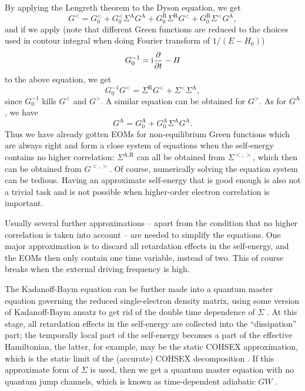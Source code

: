 \documentclass[hyperref, a4paper]{article}
\newcommand*{\ii}{\mathrm{i}}
\begin{document}
By applying the Lengreth theorem to the Dyson equation, we get 
\cite{rammer1986quantum,vspivcka2005long}
\begin{equation}
    G^< = G^<_0 + G^<_0 \Sigma^{\text{A}} G^{\text{A}}
    + G_0^{\text{R}} \Sigma^{\text{R}} G^< 
    + G_0^{\text{R}} \Sigma^{<} G^\text{A} ,
\end{equation}
and if we apply (note that different Green functions are reduced to 
the choices used in contour integral when doing Fourier transform of $1 / (E - H_0)$)
\begin{equation}
    G_0^{-1} = \ii \pdv{t} - H
\end{equation}
to the above equation, we get 
\begin{equation}
    G_0^{-1} G^< = \Sigma^{\text{R}} G^< + \Sigma^< \Sigma^{\text{A}},
\end{equation}
since $G_0^{-1}$ kills $G^<$ and $G^>$.
A similar equation can be obtained for $G^>$.
As for $G^{\text{A}}$, we have 
\begin{equation}
    G^{\text{A}} = G^{\text{A}}_0 + G^{\text{A}}_0 \Sigma^{\text{A}} G^{\text{A}}.
\end{equation}
Thus we have already gotten EOMs for non-equilibrium Green functions 
which are always right
and form a close system of equations
when the self-energy contains no higher correlation: 
$\Sigma^{\text{A}, \text{R}}$ can all be obtained from $\Sigma^{<,>}$,
which then can be obtained from $G^{<, >}$.
Of course, numerically solving the equation system can be tedious. 
Having an approximate self-energy that is good enough
is also not a trivial task and is not possible 
when higher-order electron correlation is important.

Usually several further approximations -- apart from 
the condition that no higher correlation is taken into account --
are needed to simplify the equations.
One major approximation is to discard all retardation effects in the self-energy,
and the EOMs then only contain one time variable,
instead of two.
This of course breaks when the external driving frequency is high.

The Kadanoff-Baym equation can be further made into a quantum master equation 
governing the reduced single-electron density matrix, 
using some version of Kadanoff-Baym ansatz 
to get rid of the double time dependence of $\Sigma$
\cite{lipavsky1986generalized,PhysRevB.92.205304,vspivcka2005long,hermanns2013few}.
At this stage, all retardation effects in the self-energy 
are collected into the ``dissipation'' part;
the temporally local part of the self-energy 
becomes a part of the effective Hamiltonian,
the latter, for example, may be the static COHSEX approximation,
which is the static limit of the (accurate) COHSEX decomposition
\cite{faber2014electronic}.
If this approximate form of $\Sigma$ is used,
then we get a quantum master equation 
with no quantum jump channels,
which is known as time-dependent adiabatic $GW$ \cite{attaccalite2011real,chan2021giant}.
\end{document}

